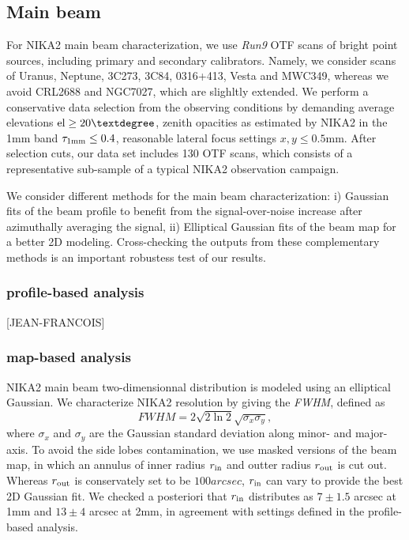 \subsection{Main beam}

For NIKA2 main beam characterization, we use \emph{Run9} OTF scans of bright point sources, including primary and secondary calibrators. Namely, we consider scans of Uranus, Neptune, 3C273, 3C84, 0316+413, Vesta and MWC349, whereas we avoid CRL2688 and NGC7027, which are slighltly extended. We perform a conservative data selection from the observing conditions by demanding average elevations $\rm{el} \ge 20°$, zenith opacities as estimated by NIKA2 in the 1mm band $\tau_{1\rm{mm}} \le 0.4$, reasonable lateral focus settings $x, y \le 0.5$mm. After selection cuts, our data set includes 130 OTF scans, which consists of a representative sub-sample of a typical NIKA2 observation campaign.    

  
We consider different methods for the main beam characterization: i) Gaussian fits of the beam profile to benefit from the signal-over-noise increase after azimuthally averaging the signal, ii) Elliptical Gaussian fits of the beam map for a better 2D modeling. Cross-checking the outputs from these complementary methods is an important robustess test of our results.   


\subsubsection{profile-based analysis}

[JEAN-FRANCOIS]

\subsubsection{map-based analysis}

NIKA2 main beam two-dimensionnal distribution is modeled using an elliptical Gaussian. We characterize NIKA2 resolution by giving the \emph{FWHM}, defined as
\begin{equation}
  FWHM = 2 \sqrt{2\ln {2}} \sqrt{\sigma_x\sigma_y},
\end{equation}
where $\sigma_x$ and $\sigma_y$ are the Gaussian standard deviation along minor- and major-axis. To avoid the side lobes contamination, we use masked versions of the beam map, in which an annulus of inner radius $r_{\rm{in}}$ and outter radius $r_{\rm{out}}$ is cut out. Whereas $r_{\rm{out}}$ is conservately set to be $100 arcsec$, $r_{\rm{in}}$ can vary to provide the best 2D Gaussian fit. We checked a posteriori that $r_{\rm{in}}$ distributes as $7 \pm 1.5$ arcsec at 1mm and $13 \pm 4$ arcsec at 2mm, in agreement with settings defined in the profile-based analysis.   

